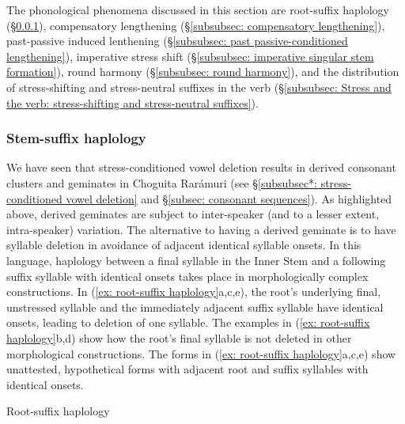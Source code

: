 
The phonological phenomena discussed in this section are root-suffix haplology (§\ref{subsubsec: stem-suffix haplology}), compensatory lengthening (§\ref{subsubsec: compensatory lengthening}), past-passive induced lenthening (§\ref{subsubsec: past passive-conditioned lengthening}), imperative stress shift (§\ref{subsubsec: imperative singular stem formation}), round harmony (§\ref{subsubsec: round harmony}), and the distribution of stress-shifting and stress-neutral suffixes in the verb (§\ref{subsubsec: Stress and the verb: stress-shifting and stress-neutral suffixes}).


\subsubsection{Stem-suffix haplology}
\label{subsubsec: stem-suffix haplology}


We have seen that stress-conditioned vowel deletion results in derived consonant clusters and geminates in Choguita Rarámuri (see §\ref{subsubsec*: stress-conditioned vowel deletion} and §\ref{subsec: consonant sequences}). As highlighted above, derived geminates are subject to inter-speaker (and to a lesser extent, intra-speaker) variation. The alternative to having a derived geminate is to have syllable deletion in avoidance of adjacent identical syllable onsets. In this language, haplology between a final syllable in the Inner Stem and a following suffix syllable with identical onsets takes place in morphologically complex constructions. In (\ref{ex: root-suffix haplology}a,c,e), the root’s underlying final, unstressed syllable and the immediately adjacent suffix syllable have identical onsets, leading to deletion of one syllable. The examples in (\ref{ex: root-suffix haplology}b,d) show how the root’s final syllable is not deleted in other morphological constructions. The forms in (\ref{ex: root-suffix haplology}a,c,e) show unattested, hypothetical forms with adjacent root and suffix syllables with identical onsets.

\ea\label{ex: root-suffix haplology}
{Root-suffix haplology}

